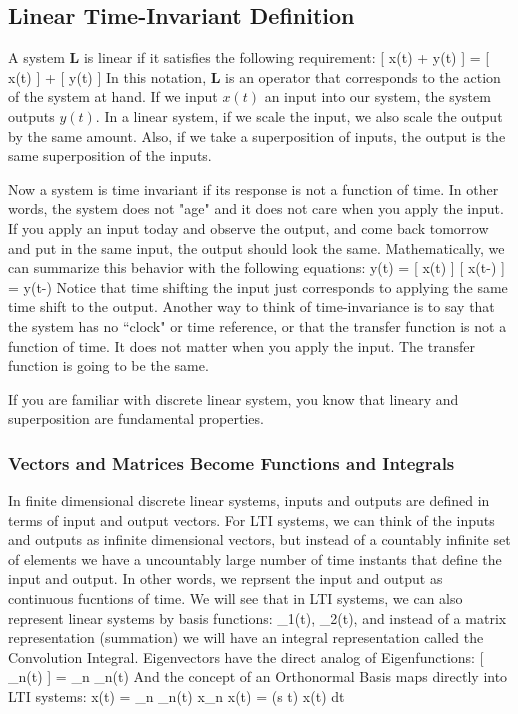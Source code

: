\subsection{Linear Time-Invariant Definition}

A system $\mathbf{L}$ is linear if it satisfies the following requirement:
\be
	 [ \alpha x(t) + \beta y(t) ] = \alpha {}[ x(t) ] + \beta {}[ y(t) ] 
\ee
In this notation, $\mathbf{L}$ is an operator that corresponds to the action of the system at hand. If we input $x(t)$ an input into our system, the system outputs $y(t)$.  In a linear system, if we scale the input, we also scale the output by the same amount. Also, if we take a superposition of inputs, the output is the same superposition of the inputs.

Now a system is time invariant if its response is not a function of time. In other words, the system does not "age" and it does not care when you apply the input.  If you apply an input today and observe the output, and come back tomorrow and put in the same input, the output should look the same.  Mathematically, we can summarize this behavior with the following equations:
\be
	y(t) =  [  x(t)  ] 
\ee
\be
	  [  x(t-\tau)  ] = y(t-\tau) 
\ee
Notice that time shifting the input just corresponds to applying the same time shift to the output.  Another way to think of time-invariance is to say that the system has no  ``clock" or time reference, or that the transfer function is not a function of time.	 It does not matter when you apply the input.  The transfer function is going to be the same. 

 If you are familiar with discrete linear system, you know that lineary and superposition are fundamental properties. 

\subsubsection{Vectors and Matrices Become Functions and Integrals}

 In finite dimensional discrete linear systems, inputs and outputs are defined in terms of input and output vectors.  For LTI systems, we can think of the inputs and outputs as infinite dimensional vectors, but instead of a countably infinite set of elements we have a uncountably large number of time instants that define the input and output.  In other words, we reprsent the input and output as continuous fucntions of time.   We will see that in LTI systems, we can also represent linear systems by basis functions:
\be
	\phi_1(t), \phi_2(t), \cdots 
\ee
and instead of a matrix representation (summation) we will have an integral representation called the Convolution Integral.  Eigenvectors have the direct analog of Eigenfunctions:
\be
	 [  \phi_n(t)  ] = \lambda_n  \phi_n(t) 
\ee
And the concept of an Orthonormal Basis maps directly into LTI systems:
\be
	x(t) = \sum_n \phi_n(t) x_n
\ee
\be
	x(t) = \int \phi(s t) x(t) dt
\ee

